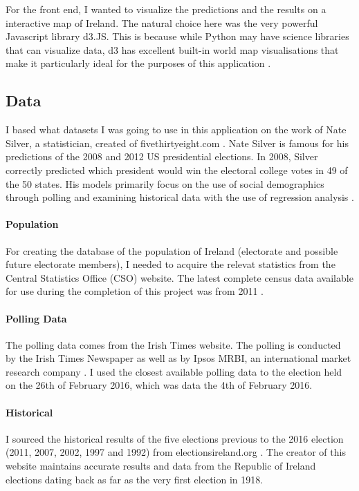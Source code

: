 For the front end, I wanted to visualize the predictions and the results on a interactive map of Ireland. The natural choice here was the very powerful Javascript library d3.JS. This is because while Python may have science libraries that can visualize data, d3 has excellent built-in world map visualisations that make it particularly ideal for the purposes of this application \cite{d3blocks}.

\subsection{Data}
I based what datasets I was going to use in this application on the work of Nate Silver, a statistician, 
created of fivethirtyeight.com \cite{natefaq}. Nate Silver is famous for his predictions of the 2008 and 2012 US presidential elections. In 2008, Silver correctly predicted which president would win the electoral college votes in 49 of the 50 states. His models primarily focus on the use of social demographics through polling and examining historical data with the use of regression analysis \cite{bobohara}.
\paragraph{Population}
For creating the database of the population of Ireland (electorate and possible future electorate members), I needed to acquire the relevat statistics from the Central Statistics Office (CSO) website. The latest complete census data available for use during the completion of this project was from 2011 \cite{cso}. 
\paragraph{Polling Data}
The polling data comes from the Irish Times website. The polling is conducted by the Irish Times Newspaper as well as by Ipsos MRBI, an international market research company \cite{irishtimes}. I used the closest available polling data to the election held on the 26th of February 2016, which was data the 4th of February 2016.
\paragraph{Historical}
I sourced the historical results of the five elections previous to the 2016 election (2011, 2007, 2002, 1997 and 1992) from electionsireland.org \cite{electionireland}. The creator of this website maintains accurate results and data from the Republic of Ireland elections dating back as far as the very first election in 1918.  
